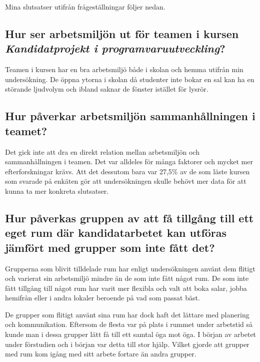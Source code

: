 Mina slutsatser utifrån frågeställningar följer nedan.

\subsection{Hur ser arbetsmiljön ut för teamen i kursen \textit{Kandidatprojekt i programvaruutveckling}?}
Teamen i kursen har en bra arbetsmiljö både i skolan och hemma utifrån min undersökning. De öppna ytorna i skolan då studenter inte bokar en sal kan ha en störande ljudvolym och ibland saknar de fönster istället för lysrör. 

\subsection{Hur påverkar arbetsmiljön sammanhållningen i teamet?}
Det gick inte att dra en direkt relation mellan arbetsmiljön och sammanhållningen i teamen. Det var alldeles för många faktorer och mycket mer efterforskningar krävs. Att det dessutom bara var 27,5\% av de som läste kursen som svarade på enkäten gör att undersökningen skulle behövt mer data för att kunna ta mer konkreta slutsatser.

\subsection{Hur påverkas gruppen av att få tillgång till ett eget rum där kandidatarbetet kan utföras jämfört med grupper som inte fått det?}
Grupperna som blivit tilldelade rum har enligt undersökningen använt dem flitigt och varierat sin arbetsmiljö mindre än de som inte fått något rum. De som inte fått tillgång till något rum har varit mer flexibla och valt att boka salar, jobba hemifrån eller i andra lokaler beroende på vad som passat bäst. 

De grupper som flitigt använt sina rum har dock haft det lättare med planering och kommunikation. Eftersom de flesta var på plats i rummet under arbetstid så kunde man i dessa grupper lätt få till ett samtal öga mot öga. I början av arbetet under förstudien och i början var detta till stor hjälp. Vilket gjorde att grupper med rum kom igång med sitt arbete fortare än andra grupper. 


